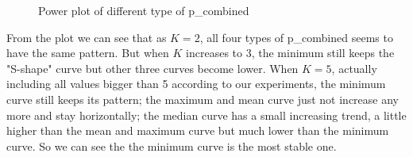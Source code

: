 \documentclass[10pt,english]{article}\usepackage{graphicx, color}
\numberwithin{equation}{section}
\numberwithin{figure}{section}
\begin{document}
\begin{figure}[htbp]
{\begin{minipage}{8cm}
\end{minipage}
}
\caption{Power plot of different type of p\_combined}
\end{figure}

From the plot we can see that as $K=2$, all four types of p\_combined seems to have the same pattern. But when $K$ increases to 3, the minimum still keeps the "S-shape" curve but other three curves become lower. When $K=5$, actually including all values bigger than 5 according to our experiments, the minimum curve still keeps its pattern; the maximum and mean curve just not increase any more and stay horizontally; the median curve has a small increasing trend, a little higher than the mean and maximum curve but much lower than the minimum curve. So we can see the the minimum curve is the most stable one.
\end{document}
